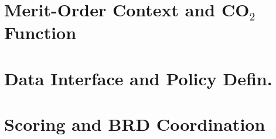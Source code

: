 \documentclass[11pt]{article}
\begin{document}
\clearpage
\appendix
\section{Merit-Order Context and CO$_2$ Function}
\label{app:merit_order}


\section{Data Interface and Policy Defin.}
\label{app:data_policy}


\section{Scoring and BRD Coordination}
\label{app:scoring_brd}

\end{document}
